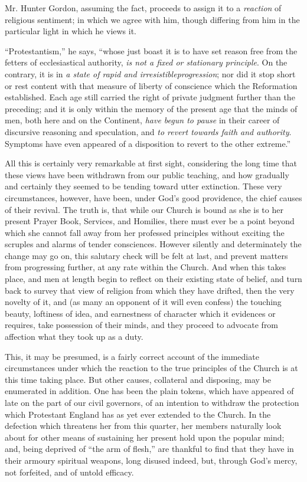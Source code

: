 Mr. Hunter Gordon, assuming the fact, proceeds to
assign it to a \emph{reaction} of religious sentiment; in which we
agree with him, though differing from him in the particular light in
which he views it.

``Protestantism,''
he says, ``whose just boast it is to have set reason free from the
fetters of ecclesiastical authority, \emph{is not a fixed or stationary
principle}. On the contrary, it is in \emph{a state of rapid and
irresistible}\emph{progression}; nor did it stop short or rest content
with that measure of liberty of conscience which the Reformation
established. Each age still carried the right of private judgment
further than the preceding; and it is only within the memory of the
present age that the minds of men, both here and on the Continent, \emph{have
begun to pause} in their career of discursive reasoning and
speculation, and \emph{to revert towards faith and authority}.
Symptoms have even appeared of a disposition to revert to the other
extreme.''

All this is certainly very remarkable at first
sight, considering the long time that these views have been withdrawn
from our public teaching, and how gradually and certainly they seemed
to be tending toward utter extinction. These very circumstances,
however, have been, under God's good providence, the chief causes of
their revival. The truth is, that while our Church is bound as
she is to her present Prayer Book, Services, and Homilies, there must
ever be a point beyond which she cannot fall away from her professed
principles without exciting the scruples and alarms of tender
consciences. However silently and determinately the change may go on,
this salutary check will be felt at last, and prevent matters from
progressing further, at any rate within the Church. And when this
takes place, and men at length begin to reflect on their existing
state of belief, and turn back to survey that view of religion from
which they have drifted, then the very novelty of it, and (as many an
opponent of it will even confess) the touching beauty, loftiness of
idea, and earnestness of character which it evidences or requires,
take possession of their minds, and they proceed to advocate from
affection what they took up as a duty.

This, it may be presumed, is a fairly correct
account of the immediate circumstances under which the reaction to the
true principles of the Church is at this time taking place. But other
causes, collateral and disposing, may be enumerated in addition. One
has been the plain tokens, which have appeared of late on the part of
our civil governors, of an intention to withdraw the protection which
Protestant England has as yet ever extended to the Church. In the
defection which threatens her from this quarter, her members naturally
look about for other means of sustaining her present hold upon the
popular mind; and, being deprived of ``the arm of flesh,'' are thankful
to find that they have in their armoury spiritual weapons, long
disused indeed, but, through God's mercy, not forfeited, and of untold
efficacy.

